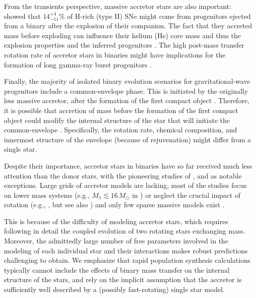 \documentclass[twocolumn,twocolappendix,trackchanges]{aastex63}
\begin{document}
From the transients perspective, massive accretor stars are also
important: \cite{zapartas:19} showed that $14_{-11}^{+4}\%$ of H-rich
(type II) SNe might come from progenitors ejected from a binary after
the explosion of their companion. The fact that they accreted mass before exploding can
influence their helium (He) core mass and thus the explosion
properties and the inferred progenitors \citep{zapartas:21}. %
The high post-mass transfer rotation
rate of accretor stars in binaries might have implications for the
formation of long gamma-ray burst progenitors \citep[e.g.,][]{cantiello:07}.

Finally, the majority of isolated binary evolution scenarios for
gravitational-wave progenitors include a common-envelope
phase. This is initiated by the originally less massive accretor,
after the formation of the first compact object
\citep[e.g.,][]{belczynski:16nat, tauris:17,
  broekgaarden:21}. Therefore, it is possible that accretion of mass
before the formation of the first compact object could modify the
internal structure of the star that will initiate the common-envelope
\citep[e.g.,][]{law-smith:20, klencki:21}. Specifically, the
rotation rate, chemical composition, and innermost structure of the
envelope (because of rejuvenation) might differ from a single star.

Despite their importance, accretor stars in binaries have so far
received much less attention than the donor stars, with the pioneering
studies of \cite{ulrich:76, hellings:83, hellings:84}, and
\cite{braun:95} as notable exceptions. Large grids of accretor models
are lacking, most of the studies focus on lower mass systems
(e.g., $M_1\lesssim 16\,M_\odot$ in \citealt{vanrensbergen:11}) or
neglect the crucial impact of rotation (e.g., \citealt{sravan:19}, but see also
\citealt{wang:20}) and only few sparse massive models exist
\citep[e.g.,][]{cantiello:07}.

This is because of the difficulty of
modeling accretor stars, which requires following in detail the coupled
evolution of two rotating stars exchanging mass. Moreover, the
admittedly large number of free parameters involved in the modeling of
each individual star and their interactions makes robust predictions
challenging to obtain. We emphasize that rapid population synthesis
calculations typically cannot include the effects of binary mass
transfer on the internal structure of the stars, and rely on the
implicit assumption that the accretor is sufficiently well described
by a (possibly fast-rotating) single star model. %
\end{document}

